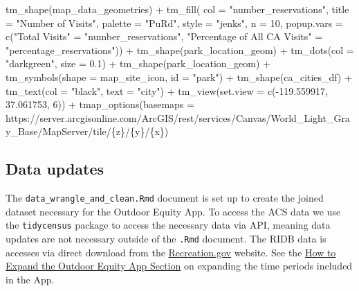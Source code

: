 \documentclass[
  11 pt,
  openany]{book}
\newenvironment{Shaded}{\begin{snugshade}}{\end{snugshade}}
\newcommand{\AttributeTok}[1]{\textcolor[rgb]{0.77,0.63,0.00}{#1}}
\newcommand{\DecValTok}[1]{\textcolor[rgb]{0.00,0.00,0.81}{#1}}
\newcommand{\FloatTok}[1]{\textcolor[rgb]{0.00,0.00,0.81}{#1}}
\newcommand{\FunctionTok}[1]{\textcolor[rgb]{0.00,0.00,0.00}{#1}}
\newcommand{\NormalTok}[1]{#1}
\newcommand{\OtherTok}[1]{\textcolor[rgb]{0.56,0.35,0.01}{#1}}
\newcommand{\SpecialCharTok}[1]{\textcolor[rgb]{0.00,0.00,0.00}{#1}}
\newcommand{\StringTok}[1]{\textcolor[rgb]{0.31,0.60,0.02}{#1}}
\begin{document}
\begin{Shaded}
\begin{Highlighting}[]
\FunctionTok{tm\_shape}\NormalTok{(map\_data\_geometries) }\SpecialCharTok{+}
  \FunctionTok{tm\_fill}\NormalTok{(}
    \AttributeTok{col =} \StringTok{"number\_reservations"}\NormalTok{,}
    \AttributeTok{title =} \StringTok{"Number of Visits"}\NormalTok{,}
    \AttributeTok{palette =} \StringTok{"PuRd"}\NormalTok{,}
    \AttributeTok{style =} \StringTok{"jenks"}\NormalTok{,}
    \AttributeTok{n =} \DecValTok{10}\NormalTok{,}
    \AttributeTok{popup.vars =} \FunctionTok{c}\NormalTok{(}\StringTok{"Total Visits"} \OtherTok{=} \StringTok{"number\_reservations"}\NormalTok{,}
                   \StringTok{"Percentage of All CA Visits"} \OtherTok{=} \StringTok{"percentage\_reservations"}\NormalTok{)) }\SpecialCharTok{+}
  \FunctionTok{tm\_shape}\NormalTok{(park\_location\_geom) }\SpecialCharTok{+}
  \FunctionTok{tm\_dots}\NormalTok{(}\AttributeTok{col =} \StringTok{"darkgreen"}\NormalTok{, }\AttributeTok{size =} \FloatTok{0.1}\NormalTok{) }\SpecialCharTok{+}
  \FunctionTok{tm\_shape}\NormalTok{(park\_location\_geom) }\SpecialCharTok{+}
  \FunctionTok{tm\_symbols}\NormalTok{(}\AttributeTok{shape =}\NormalTok{ map\_site\_icon,}
             \AttributeTok{id =} \StringTok{"park"}\NormalTok{) }\SpecialCharTok{+}
  \FunctionTok{tm\_shape}\NormalTok{(ca\_cities\_df) }\SpecialCharTok{+}
  \FunctionTok{tm\_text}\NormalTok{(}\AttributeTok{col =} \StringTok{"black"}\NormalTok{,}
          \AttributeTok{text =} \StringTok{"city"}\NormalTok{) }\SpecialCharTok{+}
  \FunctionTok{tm\_view}\NormalTok{(}\AttributeTok{set.view =} \FunctionTok{c}\NormalTok{(}\SpecialCharTok{{-}}\FloatTok{119.559917}\NormalTok{, }\FloatTok{37.061753}\NormalTok{, }\DecValTok{6}\NormalTok{)) }\SpecialCharTok{+}
  \FunctionTok{tmap\_options}\NormalTok{(}\AttributeTok{basemaps =} \StringTok{\textquotesingle{}https://server.arcgisonline.com/ArcGIS/rest/services/Canvas/World\_Light\_Gray\_Base/MapServer/tile/\{z\}/\{y\}/\{x\}\textquotesingle{}}\NormalTok{)}
\end{Highlighting}
\end{Shaded}

\hypertarget{data-updates}{%
\subsection{Data updates}\label{data-updates}}

The \texttt{data\_wrangle\_and\_clean.Rmd} document is set up to create the joined dataset necessary for the Outdoor Equity App. To access the ACS data we use the \texttt{tidycensus} package \citep{R-tidycensus} to access the necessary data via API, meaning data updates are not necessary outside of the \texttt{.Rmd} document. The RIDB data is accesses via direct download from the \href{https://ridb.recreation.gov/download}{Recreation.gov} website. See the \protect\hyperlink{how-to-expand-the-outdoor-equity-app}{How to Expand the Outdoor Equity App Section} on expanding the time periods included in the App.
\end{document}
